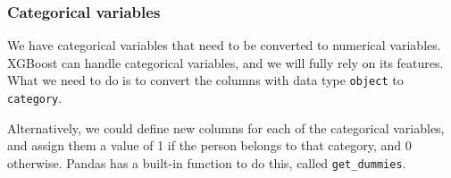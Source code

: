 \documentclass[11pt]{article}
\begin{document}
    \begin{center}
    \end{center}
    { \hspace*{\fill} \\}
    
    \begin{center}
    \end{center}
    { \hspace*{\fill} \\}
    
    \begin{center}
    \end{center}
    { \hspace*{\fill} \\}
    
    \begin{center}
    \end{center}
    { \hspace*{\fill} \\}
    
    \begin{center}
    \end{center}
    { \hspace*{\fill} \\}
    
    \subsubsection{Categorical variables}\label{categorical-variables}

We have categorical variables that need to be converted to numerical
variables. XGBoost can handle categorical variables, and we will fully
rely on its features. What we need to do is to convert the columns with
data type \texttt{object} to \texttt{category}.

Alternatively, we could define new columns for each of the categorical
variables, and assign them a value of 1 if the person belongs to that
category, and 0 otherwise. Pandas has a built-in function to do this,
called \texttt{get\_dummies}.
\end{document}
